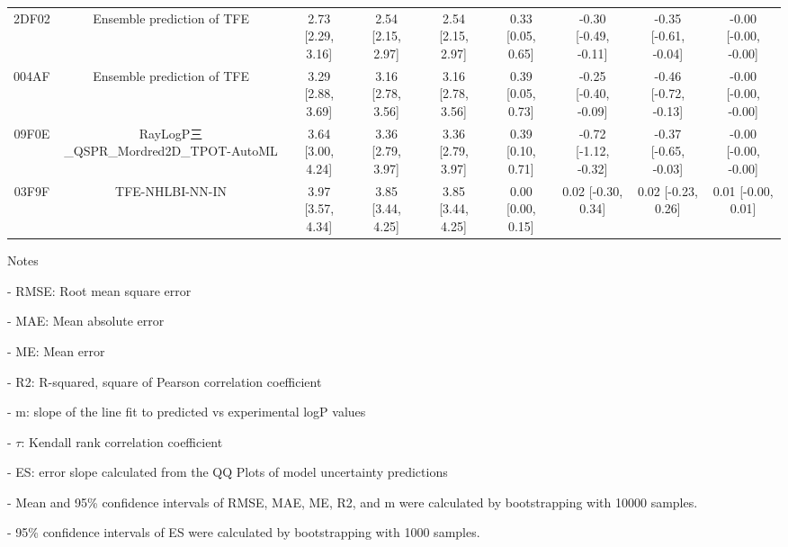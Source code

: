 \documentclass{article}
\begin{document}
\begin{center}
\begin{longtable}{|ccccccccc|}
 2DF02 &              Ensemble prediction of TFE &  2.73 [2.29, 3.16] &  2.54 [2.15, 2.97] &     2.54 [2.15, 2.97] &  0.33 [0.05, 0.65] &  -0.30 [-0.49, -0.11] &  -0.35 [-0.61, -0.04] &  -0.00 [-0.00, -0.00] \\
 004AF &              Ensemble prediction of TFE &  3.29 [2.88, 3.69] &  3.16 [2.78, 3.56] &     3.16 [2.78, 3.56] &  0.39 [0.05, 0.73] &  -0.25 [-0.40, -0.09] &  -0.46 [-0.72, -0.13] &  -0.00 [-0.00, -0.00] \\
 09F0E &  RayLogP三\_QSPR\_Mordred2D\_TPOT-AutoML &  3.64 [3.00, 4.24] &  3.36 [2.79, 3.97] &     3.36 [2.79, 3.97] &  0.39 [0.10, 0.71] &  -0.72 [-1.12, -0.32] &  -0.37 [-0.65, -0.03] &  -0.00 [-0.00, -0.00] \\
 03F9F &                         TFE-NHLBI-NN-IN &  3.97 [3.57, 4.34] &  3.85 [3.44, 4.25] &     3.85 [3.44, 4.25] &  0.00 [0.00, 0.15] &    0.02 [-0.30, 0.34] &    0.02 [-0.23, 0.26] &    0.01 [-0.00, 0.01] \\
\end{longtable}
\end{center}

Notes

- RMSE: Root mean square error

- MAE: Mean absolute error

- ME: Mean error

- R2: R-squared, square of Pearson correlation coefficient

- m: slope of the line fit to predicted vs experimental logP values

- $\tau$:  Kendall rank correlation coefficient

- ES: error slope calculated from the QQ Plots of model uncertainty predictions

- Mean and 95\% confidence intervals of RMSE, MAE, ME, R2, and m were calculated by bootstrapping with 10000 samples.

- 95\% confidence intervals of ES were calculated by bootstrapping with 1000 samples.\end{document}
\end{document}
